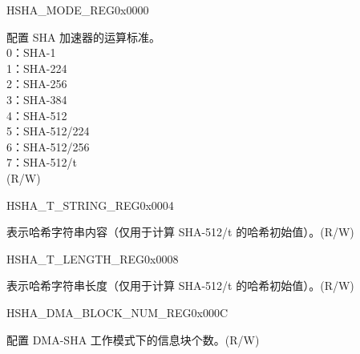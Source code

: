\begin{register}{H}{SHA\_MODE\_REG}{0x0000}\label{regdesc:SHAMODEREG}
%
%
\regnewline%
\begin{regdesc}\begin{reglist}
\label{fielddesc:SHAMODE}\item [SHA\_MODE] 配置 SHA 加速器的运算标准。\\
0：SHA-1\\
1：SHA-224\\
2：SHA-256\\
3：SHA-384\\
4：SHA-512\\
5：SHA-512/224\\
6：SHA-512/256\\
7：SHA-512/t\\
(R/W)
\end{reglist}\end{regdesc}
\end{register}


\begin{register}{H}{SHA\_T\_STRING\_REG}{0x0004}\label{regdesc:SHATSTRINGREG}
%
\regnewline%
\begin{regdesc}\begin{reglist}
\label{fielddesc:SHATSTRING}\item [SHA\_T\_STRING] 表示哈希字符串内容（仅用于计算 SHA-512/t 的哈希初始值）。(R/W)
\end{reglist}\end{regdesc}
\end{register}


\begin{register}{H}{SHA\_T\_LENGTH\_REG}{0x0008}\label{regdesc:SHATLENGTHREG}
%
%
\regnewline%
\begin{regdesc}\begin{reglist}
\label{fielddesc:SHATLENGTH}\item [SHA\_T\_LENGTH] 表示哈希字符串长度（仅用于计算 SHA-512/t 的哈希初始值）。(R/W)
\end{reglist}\end{regdesc}
\end{register}

\begin{register}{H}{SHA\_DMA\_BLOCK\_NUM\_REG}{0x000C}\label{regdesc:SHADMABLOCKNUMREG}
%
%
\regnewline%
\begin{regdesc}\begin{reglist}
\label{fielddesc:SHADMABLOCKNUM}\item [SHA\_DMA\_BLOCK\_NUM] 配置 DMA-SHA 工作模式下的信息块个数。(R/W)
\end{reglist}\end{regdesc}
\end{register}


